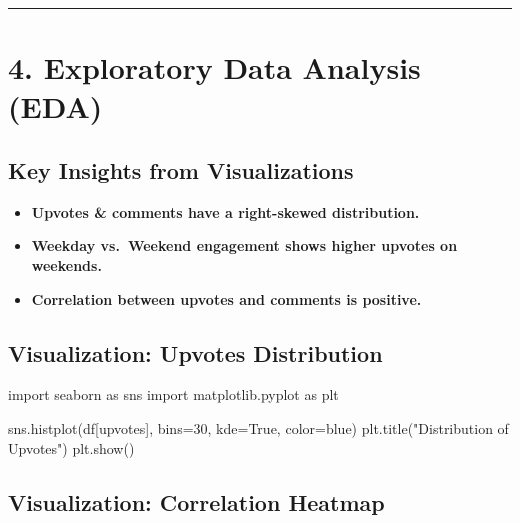 \documentclass[
  letterpaper,
  DIV=11,
  numbers=noendperiod]{scrartcl}
\newenvironment{Shaded}{\begin{snugshade}}{\end{snugshade}}
\newcommand{\DecValTok}[1]{\textcolor[rgb]{0.68,0.00,0.00}{#1}}
\newcommand{\ImportTok}[1]{\textcolor[rgb]{0.00,0.46,0.62}{#1}}
\newcommand{\NormalTok}[1]{\textcolor[rgb]{0.00,0.23,0.31}{#1}}
\newcommand{\OperatorTok}[1]{\textcolor[rgb]{0.37,0.37,0.37}{#1}}
\newcommand{\StringTok}[1]{\textcolor[rgb]{0.13,0.47,0.30}{#1}}
\newcommand{\VariableTok}[1]{\textcolor[rgb]{0.07,0.07,0.07}{#1}}
\providecommand{\tightlist}{%
  \setlength{\itemsep}{0pt}\setlength{\parskip}{0pt}}\usepackage{longtable,booktabs,array}
\begin{document}
\begin{center}\rule{0.5\linewidth}{0.5pt}\end{center}

\section{\texorpdfstring{\textbf{4. Exploratory Data Analysis
(EDA)}}{4. Exploratory Data Analysis (EDA)}}\label{exploratory-data-analysis-eda}

\subsection{\texorpdfstring{\textbf{Key Insights from
Visualizations}}{Key Insights from Visualizations}}\label{key-insights-from-visualizations}

\begin{itemize}
\tightlist
\item
  \textbf{Upvotes \& comments have a right-skewed distribution.}
\item
  \textbf{Weekday vs.~Weekend engagement shows higher upvotes on
  weekends.}
\item
  \textbf{Correlation between upvotes and comments is positive.}
\end{itemize}

\subsection{\texorpdfstring{\textbf{Visualization: Upvotes
Distribution}}{Visualization: Upvotes Distribution}}\label{visualization-upvotes-distribution}

\begin{Shaded}
\begin{Highlighting}[]
\ImportTok{import}\NormalTok{ seaborn }\ImportTok{as}\NormalTok{ sns}
\ImportTok{import}\NormalTok{ matplotlib.pyplot }\ImportTok{as}\NormalTok{ plt}

\NormalTok{sns.histplot(df[}\StringTok{\textquotesingle{}upvotes\textquotesingle{}}\NormalTok{], bins}\OperatorTok{=}\DecValTok{30}\NormalTok{, kde}\OperatorTok{=}\VariableTok{True}\NormalTok{, color}\OperatorTok{=}\StringTok{\textquotesingle{}blue\textquotesingle{}}\NormalTok{)}
\NormalTok{plt.title(}\StringTok{"Distribution of Upvotes"}\NormalTok{)}
\NormalTok{plt.show()}
\end{Highlighting}
\end{Shaded}

\subsection{\texorpdfstring{\textbf{Visualization: Correlation
Heatmap}}{Visualization: Correlation Heatmap}}\label{visualization-correlation-heatmap}
\end{document}
